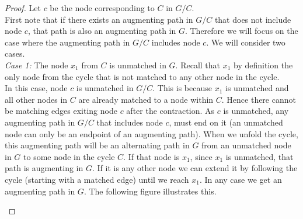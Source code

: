 \documentclass[a4paper,10pt]{article}
\begin{document}
\begin{proof}
Let $c$ be the node corresponding to $C$ in $G \slash C$.  \\

First note that if there exists an augmenting path in $G \slash C$ that does not
include node $c$, that path is also an augmenting path in $G$. Therefore we will
focus on the case where the augmenting path in $G \slash C$ includes node $c$.
We will consider 
two cases. \\

\emph{Case 1:} The node $x_1$ from $C$ is unmatched in $G$. Recall that $x_1$ by definition
the only node from the cycle that is not matched to any other node in the cycle. \\

In this case, node $c$ is unmatched in $G \slash C$. This is because $x_1$ is unmatched
and all other nodes in $C$ are already matched to a node within $C$. Hence there cannot be
matching edges exiting node $c$ after the contraction. 
As $c$ is unmatched, any augmenting path in $G \slash C$ that includes node $c$, must 
end on it (an unmatched node can only be an endpoint of an augmenting path). When we unfold
the cycle, this augmenting path will be an alternating path in $G$ from an unmatched node in $G$ to
some node in the cycle $C$. If that node is $x_1$, since $x_1$ is unmatched, that path is
augmenting in $G$. If it is any other node we can extend it by following the cycle
(starting with a matched edge) until we reach $x_1$. In any case we get an augmenting
path in $G$. The following figure illustrates this.

\vspace{0.5cm}

\begin{center}
\end{center}
\end{proof}
\end{document}
